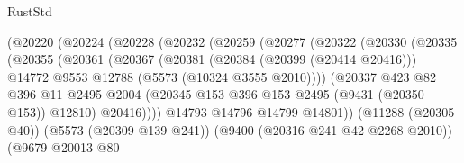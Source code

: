\begin{lexlean}{RustStd}
\begin{coremodule}
                                (@20220
                                  (@20224
                                    (@20228
                                      (@20232
                                        (@20259
                                          (@20277
                                            (@20322
                                              (@20330
                                                (@20335
                                                  (@20355
                                                    (@20361
                                                      (@20367
                                                        (@20381
                                                          (@20384 (@20399 (@20414 @20416)))
                                                          @14772
                                                          @9553
                                                          @12788
                                                          (@5573 (@10324 @3555 @2010))))
                                                      (@20337
                                                        @423
                                                        @82
                                                        @396
                                                        @11
                                                        @2495
                                                        @2004
                                                        (@20345
                                                          @153
                                                          @396
                                                          @153
                                                          @2495
                                                          (@9431 (@20350 @153))
                                                          @12810)
                                                        @20416))))
                                                @14793
                                                @14796
                                                @14799
                                                @14801))
                                            (@11288 (@20305 @40))
                                            (@5573 (@20309 @139 @241))
                                            (@9400 (@20316 @241 @42 @2268 @2010))
                                            (@9679
                                              @20013
                                              @80

\end{coremodule}
\end{lexlean}
